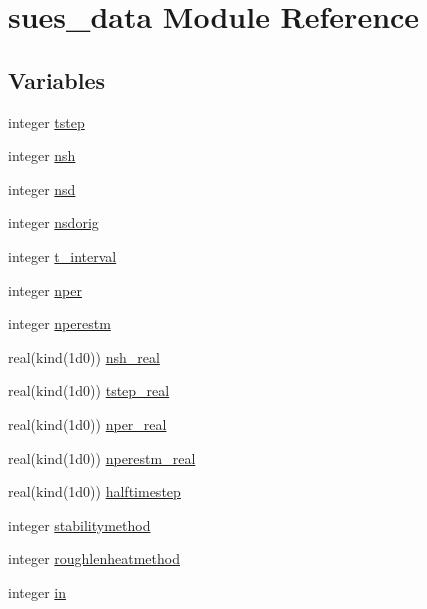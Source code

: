 \hypertarget{namespacesues__data}{}\section{sues\+\_\+data Module Reference}
\label{namespacesues__data}
\subsection*{Variables}
\begin{DoxyCompactItemize}
\item 
integer \hyperlink{namespacesues__data_ac6af955be55f5fe026b4ba1ab6ec480e}{tstep}
\item 
integer \hyperlink{namespacesues__data_ab28124e60c813d253c9b095050fe3ebe}{nsh}
\item 
integer \hyperlink{namespacesues__data_a1fd9bd64afb3354e7e90260d0f0c6e94}{nsd}
\item 
integer \hyperlink{namespacesues__data_aa6fc5b2432c730d5b950fa2b37ac4630}{nsdorig}
\item 
integer \hyperlink{namespacesues__data_a91f69564eaa9aa824c0043d532502229}{t\+\_\+interval}
\item 
integer \hyperlink{namespacesues__data_aee4c8e6d4c94a2af0599fb1cd40f51ed}{nper}
\item 
integer \hyperlink{namespacesues__data_a699b9583b9326461b9220d76056b85b5}{nperestm}
\item 
real(kind(1d0)) \hyperlink{namespacesues__data_ab2070158f8b88b8f7835232841061718}{nsh\+\_\+real}
\item 
real(kind(1d0)) \hyperlink{namespacesues__data_a81a241a978fdd040dee716c4e68dc786}{tstep\+\_\+real}
\item 
real(kind(1d0)) \hyperlink{namespacesues__data_a130a64aeadd8ca145f5ec2d1416174f5}{nper\+\_\+real}
\item 
real(kind(1d0)) \hyperlink{namespacesues__data_aad88365e0d1f6430e9ac39dd331048c1}{nperestm\+\_\+real}
\item 
real(kind(1d0)) \hyperlink{namespacesues__data_a6e2f669999914372fd2de922c917e6dc}{halftimestep}
\item 
integer \hyperlink{namespacesues__data_a1005846b0d388b51d731e6d5e404e2d6}{stabilitymethod}
\item 
integer \hyperlink{namespacesues__data_a9dff10e1f001cc8241e5d1d72a4beeb2}{roughlenheatmethod}
\item 
integer \hyperlink{namespacesues__data_ae5a31f2a4addf36e077f1e18eabf6052}{in}
\item 

\end{DoxyCompactItemize}
